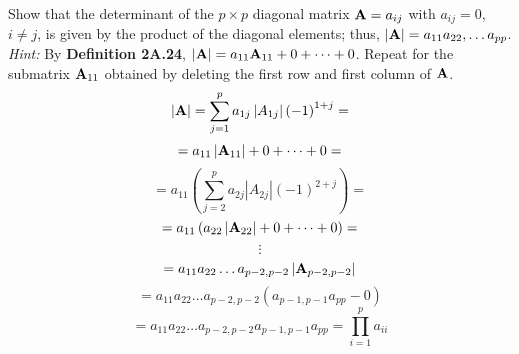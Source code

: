         Show that the determinant of the $p \times p$ diagonal matrix $\bold{A}= {a_{ij}}$ with $a_{ij} = 0$, $i \ne j$,
        is given by the product of the diagonal elements; thus, $\left|\bold{A}\right| = a_{11} a_{22}, \dots a_{pp}$.
        \newline
        \textit{Hint:} By \textbf{Definition 2A.24}, $\left|\bold{A}\right| = a_{11} \bold{A}_{11} + 0 + \dots + 0$. Repeat for the submatrix
        $\bold{A}_{11}$ obtained by deleting the first row and first column of $\bold{A}$.
        \[
            \left|\bold{A}\right| = \sum_{j=1}^p{a_{1j}\left|A_{1j}\right|{\left(-1\right)}^{1+j}} =
        \]
        \[
            = a_{11}\left|\bold{A}_{11}\right| + 0 + \dots + 0 =
        \]
        \[
            = a_{11}\left(\sum_{j=2}^p{a_{2j}\left|A_{2j}\right|{\left(-1\right)}^{2+j}}\right) =
        \]
        \[
            = a_{11}\left(a_{22}\left|\bold{A}_{22}\right| + 0 + \dots + 0\right) =
        \]
        \[
            \vdots
        \]
        \[
            = a_{11}a_{22}\dots a_{p-2, p-2}\left|\bold{A}_{p-2, p-2}\right|
        \]
        \[
            = a_{11}a_{22}\dots a_{p-2, p-2}\left(a_{p-1, p-1}a_{pp} - 0\right)
        \]
        \[
            = a_{11}a_{22}\dots a_{p-2, p-2}a_{p-1, p-1}a_{pp} = \prod_{i=1}^p{a_{ii}}
        \]